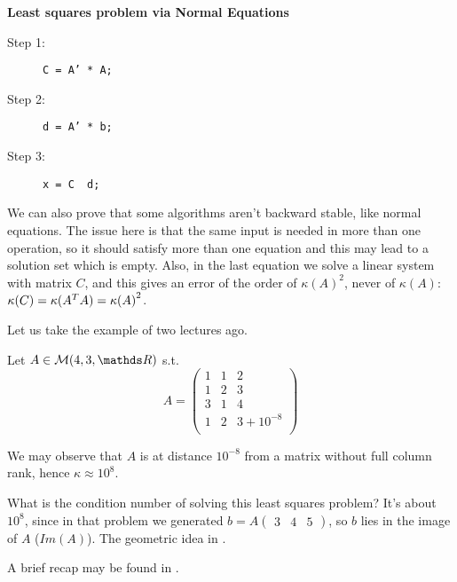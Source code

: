 \documentclass[ComputationalMathematics.tex]{subfiles}
\begin{document}
\textbf{Least squares problem via Normal Equations}
\begin{description}
  \item[{\sc Step 1:}] \texttt{C = A' * A;}
  \item[{\sc Step 2:}] \texttt{d = A' * b;}
  \item[{\sc Step 3:}] \texttt{x = C \ d;}
\end{description}

We can also prove that some algorithms aren't backward stable, like normal equations. The issue here is that the same input is needed in more than one operation, so it should satisfy more than one equation and this may lead to a solution set which is empty. Also, in the last equation we solve a linear system with matrix $C$, and this gives an error of the order of ${\kappa(A)}^2$, never of $\kappa(A)$: $\kappa(C) = \kappa({A}^{T} A) = {\kappa(A)}^2$.

Let us take the example of two lectures ago.

\begin{example}
   Let $A \in \mathcal{M}(4, 3, \R)$ s.t.
   \[
  A = \begin{pmatrix}
    1&1&2\\
    1&2&3\\
    3&1&4\\
    1&2& 3 + 10^{-8}\\
  \end{pmatrix}
    \]

    We may observe that $A$ is at distance $10^{-8}$ from a matrix without full column rank, hence $\kappa \approx 10^8$.  

  What is the condition number of solving this least squares problem?
  It's about $10^8$, since in that problem we generated $b= A \begin{pmatrix} 3 & 4 & 5 \end{pmatrix}$, so $b$ lies in the image of $A$ ($Im(A)$). The geometric idea in .

\end{example}

A brief recap may be found in .
\end{document}
